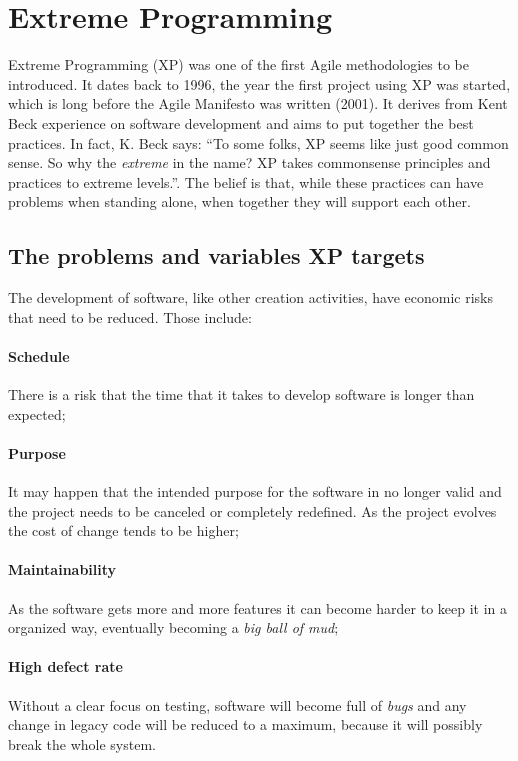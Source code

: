 \documentclass[conference]{IEEEtran}
\begin{document}
\section{Extreme Programming}
Extreme Programming (XP) was one of the first Agile methodologies to be introduced. It dates back to 1996, the year the first project using XP was started\cite{Wells:2IqWBPJS}, which is long before the Agile Manifesto was written (2001)\cite{Martin:2006vx}. It derives from Kent Beck experience on software development and aims to put together the best practices. In fact, K. Beck says: ``To some folks, XP seems like just good common sense. So why the \textit{extreme} in the name? XP takes commonsense principles and practices to extreme levels.''\cite{Beck:2004tc}. The belief is that, while these practices can have problems when standing alone, when together they will support each other.

\subsection{The problems and variables XP targets}
The development of software, like other creation activities, have economic risks that need to be reduced. Those include:
\paragraph{Schedule} There is a risk that the time that it takes to develop software is longer than expected;
\paragraph{Purpose} It may happen that the intended purpose for the software in no longer valid and the project needs to be canceled or completely redefined. As the project evolves the cost of change tends to be higher;
\paragraph{Maintainability} As the software gets more and more features it can become harder to keep it in a organized way, eventually becoming a \textit{big ball of mud}\cite{bigballofmud};
\paragraph{High defect rate} Without a clear focus on testing, software will become full of \textit{bugs} and any change in legacy code will be reduced to a maximum, because it will possibly break the whole system.
\end{document}
